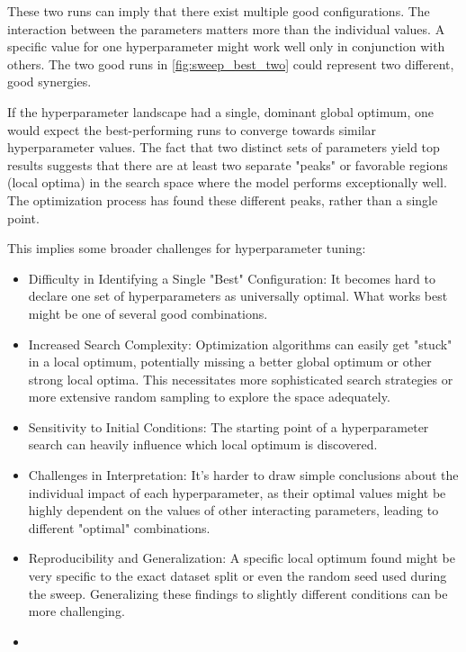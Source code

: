 These two runs can imply that there exist multiple good configurations. The interaction between the parameters matters more than the individual values. A specific value for one hyperparameter might work well only in conjunction with others. The two good runs in \autoref{fig:sweep_best_two} could represent two different, good synergies. 


If the hyperparameter landscape had a single, dominant global optimum, one would expect the best-performing runs to converge towards similar hyperparameter values. The fact that two distinct sets of parameters yield top results suggests that there are at least two separate "peaks" or favorable regions (local optima) in the search space where the model performs exceptionally well. The optimization process has found these different peaks, rather than a single point.

This implies some broader challenges for hyperparameter tuning:

\begin{itemize}
    \item Difficulty in Identifying a Single "Best" Configuration: It becomes hard to declare one set of hyperparameters as universally optimal. What works best might be one of several good combinations.
    \item Increased Search Complexity: Optimization algorithms can easily get "stuck" in a local optimum, potentially missing a better global optimum or other strong local optima. This necessitates more sophisticated search strategies or more extensive random sampling to explore the space adequately.
    \item Sensitivity to Initial Conditions: The starting point of a hyperparameter search can heavily influence which local optimum is discovered.
    \item Challenges in Interpretation: It's harder to draw simple conclusions about the individual impact of each hyperparameter, as their optimal values might be highly dependent on the values of other interacting parameters, leading to different "optimal" combinations.
    \item Reproducibility and Generalization: A specific local optimum found might be very specific to the exact dataset split or even the random seed used during the sweep. Generalizing these findings to slightly different conditions can be more challenging.
    \item 
\end{itemize}


